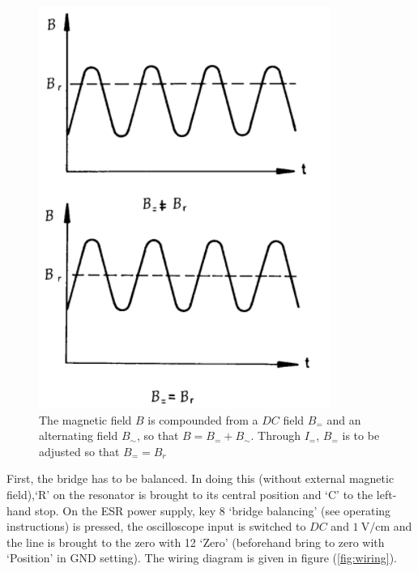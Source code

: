 \documentclass[%
 reprint,
nofootinbib,
 amsmath,amssymb,
 aps,
floatfix,
]{revtex4-2}
\begin{document}
    \begin{figure}
        \centering
        \includegraphics{Figures/magfields.png}
        \caption{The magnetic field $B$ is compounded from a $DC$ field $B_{=}$ and an alternating field $B_{\sim}$, so that $B = B_{=} + B_{\sim}$. Through $I_{=}$, $B_{=}$ is to be adjusted so that $B_{=} = B_r$}
        \label{fig:magfields}
    \end{figure}
    \par
    First, the bridge has to be balanced. In doing this (without external magnetic field),`R' on the resonator is brought to its central position and `C' to the left-hand stop. On the ESR power supply, key 8 `bridge balancing' (see operating instructions) is pressed, the oscilloscope input is switched to $DC$ and $\SI{1}{\volt \per \centi \metre}$ and the line is brought to the zero with 12 `Zero' (beforehand bring to zero with `Position' in GND setting). The wiring diagram is given in figure (\ref{fig:wiring}).
\end{document}
